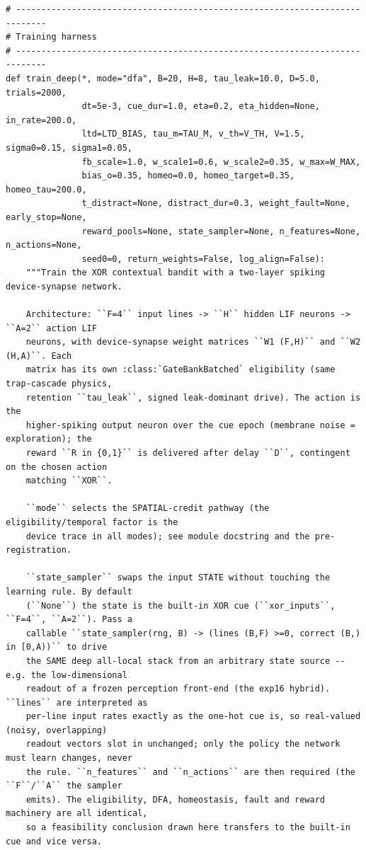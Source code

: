 \begin{lstlisting}[caption={mrl\_trace/deep.py},label={lst:siox-src-deep}]
# ----------------------------------------------------------------------------
# Training harness
# ----------------------------------------------------------------------------
def train_deep(*, mode="dfa", B=20, H=8, tau_leak=10.0, D=5.0, trials=2000,
               dt=5e-3, cue_dur=1.0, eta=0.2, eta_hidden=None, in_rate=200.0,
               ltd=LTD_BIAS, tau_m=TAU_M, v_th=V_TH, V=1.5, sigma0=0.15, sigma1=0.05,
               fb_scale=1.0, w_scale1=0.6, w_scale2=0.35, w_max=W_MAX,
               bias_o=0.35, homeo=0.0, homeo_target=0.35, homeo_tau=200.0,
               t_distract=None, distract_dur=0.3, weight_fault=None, early_stop=None,
               reward_pools=None, state_sampler=None, n_features=None, n_actions=None,
               seed0=0, return_weights=False, log_align=False):
    """Train the XOR contextual bandit with a two-layer spiking device-synapse network.

    Architecture: ``F=4`` input lines -> ``H`` hidden LIF neurons -> ``A=2`` action LIF
    neurons, with device-synapse weight matrices ``W1 (F,H)`` and ``W2 (H,A)``. Each
    matrix has its own :class:`GateBankBatched` eligibility (same trap-cascade physics,
    retention ``tau_leak``, signed leak-dominant drive). The action is the
    higher-spiking output neuron over the cue epoch (membrane noise = exploration); the
    reward ``R in {0,1}`` is delivered after delay ``D``, contingent on the chosen action
    matching ``XOR``.

    ``mode`` selects the SPATIAL-credit pathway (the eligibility/temporal factor is the
    device trace in all modes); see module docstring and the pre-registration.

    ``state_sampler`` swaps the input STATE without touching the learning rule. By default
    (``None``) the state is the built-in XOR cue (``xor_inputs``, ``F=4``, ``A=2``). Pass a
    callable ``state_sampler(rng, B) -> (lines (B,F) >=0, correct (B,) in [0,A))`` to drive
    the SAME deep all-local stack from an arbitrary state source -- e.g. the low-dimensional
    readout of a frozen perception front-end (the exp16 hybrid). ``lines`` are interpreted as
    per-line input rates exactly as the one-hot cue is, so real-valued (noisy, overlapping)
    readout vectors slot in unchanged; only the policy the network must learn changes, never
    the rule. ``n_features`` and ``n_actions`` are then required (the ``F``/``A`` the sampler
    emits). The eligibility, DFA, homeostasis, fault and reward machinery are all identical,
    so a feasibility conclusion drawn here transfers to the built-in cue and vice versa.


\end{lstlisting}
